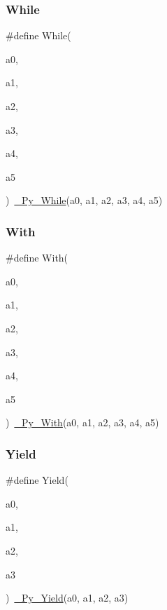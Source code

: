 \mbox{\label{_python-ast_8h_ae39ca9133484f2b999cbe74d93635d96}} 
\subsubsection{\texorpdfstring{While}{While}}
{\footnotesize\ttfamily \#define While(\begin{DoxyParamCaption}\item[{}]{a0,  }\item[{}]{a1,  }\item[{}]{a2,  }\item[{}]{a3,  }\item[{}]{a4,  }\item[{}]{a5 }\end{DoxyParamCaption})~\mbox{\hyperlink{_python-ast_8h_a95968d26701a57ae6bb604224b74ecee}{\+\_\+\+Py\+\_\+\+While}}(a0, a1, a2, a3, a4, a5)}

\mbox{\label{_python-ast_8h_a0ef7ddc3b9bcb5c59195acbe024e3938}} 
\subsubsection{\texorpdfstring{With}{With}}
{\footnotesize\ttfamily \#define With(\begin{DoxyParamCaption}\item[{}]{a0,  }\item[{}]{a1,  }\item[{}]{a2,  }\item[{}]{a3,  }\item[{}]{a4,  }\item[{}]{a5 }\end{DoxyParamCaption})~\mbox{\hyperlink{_python-ast_8h_abd123e9dd4c50b67b73c8f676ff74315}{\+\_\+\+Py\+\_\+\+With}}(a0, a1, a2, a3, a4, a5)}

\mbox{\label{_python-ast_8h_ad1fd9f3236ea0923e1d29bc825cc0249}} 
\subsubsection{\texorpdfstring{Yield}{Yield}}
{\footnotesize\ttfamily \#define Yield(\begin{DoxyParamCaption}\item[{}]{a0,  }\item[{}]{a1,  }\item[{}]{a2,  }\item[{}]{a3 }\end{DoxyParamCaption})~\mbox{\hyperlink{_python-ast_8h_aef15cd5d48730f2c5f4215d2cfc170df}{\+\_\+\+Py\+\_\+\+Yield}}(a0, a1, a2, a3)}



